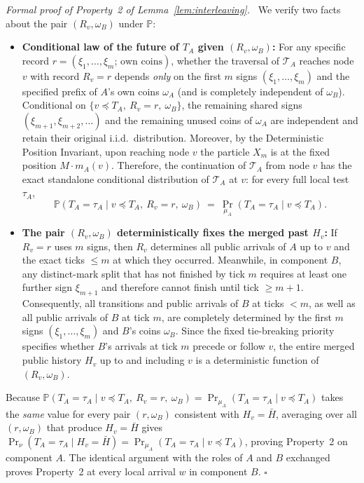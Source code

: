 \documentclass[11pt,letterpaper]{article}
\newenvironment{proof}[1][Proof]{\par\smallskip\noindent\textit{#1.}\ \ignorespaces}{\hfill$\square$\par\medskip}
\begin{document}
\begin{proof}[Formal proof of Property~2 of Lemma~\ref{lem:interleaving}]
We verify two facts about the pair $(R_v, \omega_B)$ under $\mathbb P$:
\begin{itemize}
\item \textbf{Conditional law of the future of $T_A$ given $(R_v,\omega_B)$:}
  For any specific record $r=(\xi_1,\ldots,\xi_m;\,\text{own coins})$, whether the traversal of $\mathcal T_A$ reaches node $v$ with record $R_v=r$ depends \emph{only} on the first $m$ signs $(\xi_1,\ldots,\xi_m)$ and the specified prefix of $A$'s own coins $\omega_A$ (and is completely independent of $\omega_B$). Conditional on $\{v\preceq T_A,\ R_v=r,\ \omega_B\}$, the remaining shared signs $(\xi_{m+1},\xi_{m+2},\ldots)$ and the remaining unused coins of $\omega_A$ are independent and retain their original i.i.d.\ distribution. Moreover, by the Deterministic Position Invariant, upon reaching node $v$ the particle $X_m$ is at the fixed position $M\cdot m_A(v)$. Therefore, the continuation of $\mathcal T_A$ from node $v$ has the exact standalone conditional distribution of $\mathcal T_A$ at $v$: for every full local test $\tau_A$,
  \[
    \mathbb P(T_A=\tau_A \mid v\preceq T_A,\ R_v=r,\ \omega_B)\ =\ \Pr_{\mu_A}(T_A=\tau_A\mid v\preceq T_A).
  \]
\item \textbf{The pair $(R_v,\omega_B)$ deterministically fixes the merged past $H_v$:}
  If $R_v=r$ uses $m$ signs, then $R_v$ determines all public arrivals of $A$ up to $v$ and the exact ticks $\le m$ at which they occurred. Meanwhile, in component $B$, any distinct-mark split that has not finished by tick $m$ requires at least one further sign $\xi_{m+1}$ and therefore cannot finish until tick $\ge m+1$. Consequently, all transitions and public arrivals of $B$ at ticks $<m$, as well as all public arrivals of $B$ at tick $m$, are completely determined by the first $m$ signs $(\xi_1,\ldots,\xi_m)$ and $B$'s coins $\omega_B$. Since the fixed tie-breaking priority specifies whether $B$'s arrivals at tick $m$ precede or follow $v$, the entire merged public history $H_v$ up to and including $v$ is a deterministic function of $(R_v,\omega_B)$.
\end{itemize}

Because $\mathbb P(T_A=\tau_A \mid v\preceq T_A,\ R_v=r,\ \omega_B) = \Pr_{\mu_A}(T_A=\tau_A\mid v\preceq T_A)$ takes the \emph{same} value for every pair $(r,\omega_B)$ consistent with $H_v=\bar H$, averaging over all $(r,\omega_B)$ that produce $H_v=\bar H$ gives $\Pr_\nu(T_A=\tau_A\mid H_v=\bar H) = \Pr_{\mu_A}(T_A=\tau_A\mid v\preceq T_A)$, proving Property~2 on component $A$. The identical argument with the roles of $A$ and $B$ exchanged proves Property~2 at every local arrival $w$ in component $B$.
\end{proof}
\end{document}
